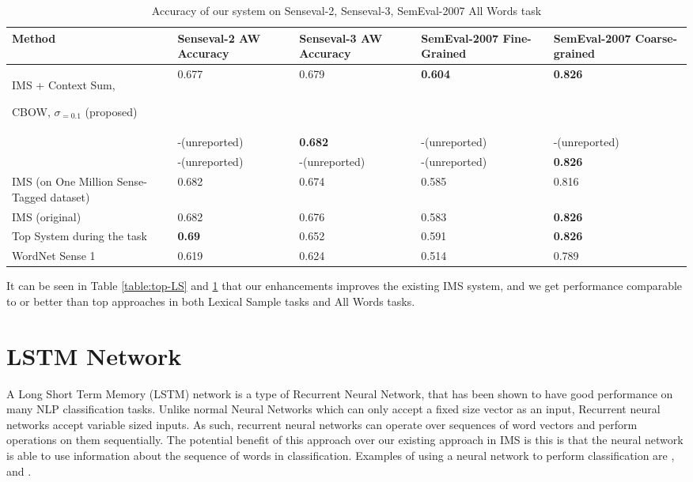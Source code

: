 \documentclass[11pt]{article}
\begin{document}
\begin{table}
	\caption{Accuracy of our system on Senseval-2, Senseval-3, SemEval-2007 All Words task}
	\label{table:All-AW}
	\begin{center}
		\begin{tabular}{| p{4cm} | p{2cm} | p{3cm} | p{3cm} | p{3cm} | }
			\hline
			Method & Senseval-2 AW Accuracy & Senseval-3 AW Accuracy & SemEval-2007 Fine-Grained & SemEval-2007 Coarse-grained \\
			\hline
			IMS + Context Sum, 
			
			CBOW, $\sigma _{=0.1}$ (proposed) & 0.677 & 0.679 & {\bf0.604} & {\bf 0.826 } \\
			\hline
			
			\cite{Taghipour15} & -(unreported) & {\bf0.682} & -(unreported) & -(unreported) \\
			\hline
			\cite{chen2014} & -(unreported) & -(unreported) & -(unreported) & {\bf 0.826 } \\
			\hline
			IMS (on One Million Sense-Tagged dataset) & 0.682 & 0.674 & 0.585 & 0.816 \\
			\hline
			IMS (original) & 0.682 & 0.676 & 0.583 & {\bf 0.826 }  \\
			\hline
			Top System during the task & {\bf0.69} & 0.652 & 0.591 & {\bf 0.826 } \\
			\hline
			WordNet Sense 1 & 0.619 & 0.624 & 0.514 & 0.789\\
			\hline
		\end{tabular}
	\end{center}
\end{table}


It can be seen in Table \ref{table:top-LS} and \ref{table:All-AW} that our enhancements improves the existing IMS system, and we get performance comparable to or better than top approaches in both Lexical Sample tasks and All Words tasks. 

\section{LSTM Network}

A Long Short Term Memory (LSTM) network is a type of Recurrent Neural Network, that has been shown to have good performance on many NLP classification tasks. Unlike normal Neural Networks which can only accept a fixed size vector as an input, Recurrent neural networks accept variable sized inputs. As such, recurrent neural networks can operate over sequences of word vectors and perform operations on them sequentially. The potential benefit of this approach over our existing approach in IMS is this is that the neural network is able to use information about the sequence of words in classification. Examples of using a neural network to perform classification are \cite{socher2011parsing}, and \cite{socher2013recursive}. 
\end{document}
